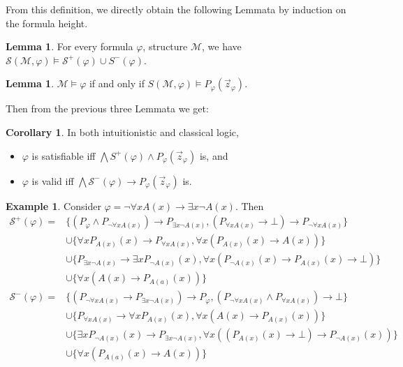 \documentclass[a4paper,11pt]{report}
\theoremstyle{definition}
\theoremstyle{definition}
\newtheorem{corollary}[theorem]{Corollary}
\theoremstyle{definition}
\newtheorem{lemma}[theorem]{Lemma}
\theoremstyle{definition}
\theoremstyle{definition}
\theoremstyle{definition}
\newtheorem{example}[theorem]{Example}
\theoremstyle{definition}
\begin{document}
	From this definition, we directly obtain the following Lemmata by induction on the formula height.
	\begin{lemma}\label{thm:struct1}
		For every formula $\varphi$, structure $\mathcal M$, we have $\mathcal S(\mathcal M, \varphi)\models\mathcal S^+(\varphi)\cup S^-(\varphi)$.
	\end{lemma}
	
	\begin{lemma}\label{thm:struct2}
		$\mathcal M\models \varphi$ if and only if $S(\mathcal M, \varphi)\models P_\varphi(\vec z_\varphi)$.
	\end{lemma}
	
	Then from the previous three Lemmata we get:
	
	\begin{corollary}\label{equivalid}
		In both intuitionistic and classical logic,
		\begin{itemize}
			\item $\varphi$ is satisfiable iff $\mathcal \bigwedge S^+(\varphi)\wedge P_\varphi(\vec z_\varphi)$ is, and
			\item $\varphi$ is valid iff $\bigwedge\mathcal S^-(\varphi)\to P_\varphi(\vec z_\varphi)$ is.
		\end{itemize}
	\end{corollary}

	\begin{example}
		Consider $\varphi = \neg\forall x A(x)\to \exists x\neg A(x)$. Then
		\begin{align*}
			\mathcal S^+(\varphi) = &\{(P_\varphi\wedge P_{\neg\forall x A(x)})\to P_{\exists x\neg A(x)}, (P_{\forall xA(x)}\to\bot)\to P_{\neg \forall xA(x)}\}\\&\cup\{\forall xP_{A(x)}(x)\to P_{\forall xA(x)}, \forall x(P_{A(x)}(x)\to A(x))\}\\&\cup\{P_{\exists x\neg A(x)}\to \exists xP_{\neg A(x)}(x), \forall x(P_{\neg A(x)}(x)\to P_{A(x)}(x)\to \bot)\}\\&\cup\{\forall x(A(x)\to P_{A(a)}(x))\}\\
			\mathcal S^-(\varphi) = &\{(P_{\neg\forall x A(x)}\to P_{\exists x\neg A(x)})\to P_\varphi,  (P_{\neg \forall xA(x)}\wedge P_{\forall xA(x)})\to\bot\}\\&\cup\{P_{\forall xA(x)}\to \forall xP_{A(x)}(x), \forall x(A(x)\to P_{A(x)}(x))\}\\&\cup\{\exists xP_{\neg A(x)}(x)\to P_{\exists x\neg A(x)}, \forall x((P_{A(x)}(x)\to \bot)\to P_{\neg A(x)}(x))\}\\&\cup\{\forall x(P_{A(a)}(x)\to A(x))\}
		\end{align*}
	\end{example}
\end{document}
